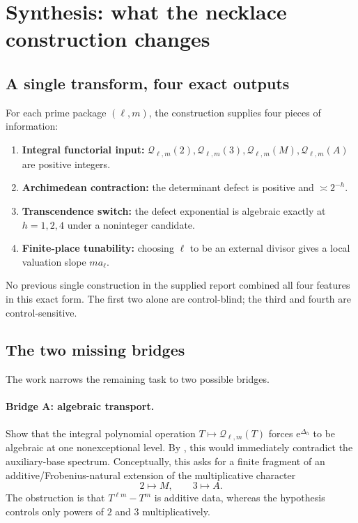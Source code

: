 \documentclass[11pt]{article}
\numberwithin{equation}{section}
\theoremstyle{definition}
\theoremstyle{remark}
\newcommand{\e}{\mathrm e}
\begin{document}
\section{Synthesis: what the necklace construction changes}

\subsection{A single transform, four exact outputs}

For each prime package $(\ell,m)$, the construction supplies four pieces of information:
\begin{enumerate}[label=(\arabic*)]
  \item \textbf{Integral functorial input:}
  $\mathcal Q_{\ell,m}(2),\mathcal Q_{\ell,m}(3),
   \mathcal Q_{\ell,m}(M),\mathcal Q_{\ell,m}(A)$ are positive integers.
  \item \textbf{Archimedean contraction:}
  the determinant defect is positive and $\asymp2^{-h}$.
  \item \textbf{Transcendence switch:}
  the defect exponential is algebraic exactly at $h=1,2,4$ under a noninteger candidate.
  \item \textbf{Finite-place tunability:}
  choosing $\ell$ to be an external divisor gives a local valuation slope $ma_\ell$.
\end{enumerate}
No previous single construction in the supplied report combined all four features in this exact form.  The first two alone are control-blind; the third and fourth are control-sensitive.

\subsection{The two missing bridges}

The work narrows the remaining task to two possible bridges.

\paragraph{Bridge A: algebraic transport.}
Show that the integral polynomial operation $T\mapsto\mathcal Q_{\ell,m}(T)$ forces $\e^{\Delta_h}$ to be algebraic at one nonexceptional level.  By , this would immediately contradict the auxiliary-base spectrum.  Conceptually, this asks for a finite fragment of an additive/Frobenius-natural extension of the multiplicative character
\[
  2\longmapsto M,
  \qquad 3\longmapsto A.
\]
The obstruction is that $T^{\ell m}-T^m$ is additive data, whereas the hypothesis controls only powers of $2$ and $3$ multiplicatively.
\end{document}
